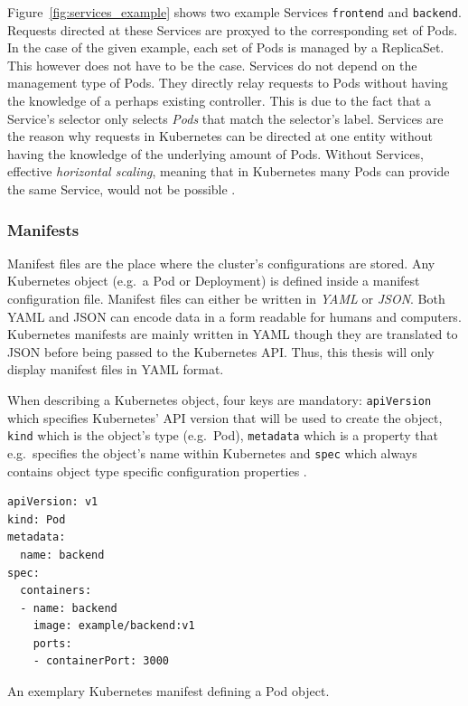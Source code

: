 Figure~\ref{fig:services_example} shows two example Services \texttt{frontend}
and \texttt{backend}. Requests directed at these Services are proxyed to the
corresponding set of Pods. In the case of the given example, each set of Pods
is managed by a ReplicaSet. This however does not have to be the case. Services
do not depend on the management type of Pods. They directly relay requests to
Pods without having the knowledge of a perhaps existing controller. This is due
to the fact that a Service's selector only selects \textit{Pods} that match the
selector's label. Services are the reason why requests in Kubernetes can be
directed at one entity without having the knowledge of the underlying amount of
Pods. Without Services, effective \textit{horizontal scaling}, meaning that in
Kubernetes many Pods can provide the same Service, would not be possible
\autocite[Ch. 5]{LuksaKubernetesAction2017}.

\subsubsection{Manifests}%
\label{ssub:Manifests}
Manifest files are the place where the cluster's configurations are stored. Any
Kubernetes object (e.g.\ a Pod or Deployment) is defined inside a manifest
configuration file. Manifest files can either be written in \textit{YAML} or
\textit{JSON}. Both YAML and JSON can encode data in a form readable for humans
and computers. Kubernetes manifests are mainly written in YAML though they are
translated to JSON before being passed to the Kubernetes \ac{API}. Thus, this
thesis will only display manifest files in YAML format.

When describing a Kubernetes object, four keys are mandatory:
\texttt{apiVersion} which specifies Kubernetes' \ac{API} version that will be
used to create the object, \texttt{kind} which is the object's type (e.g.\
Pod), \texttt{metadata} which is a property that e.g.\ specifies the object's
name within Kubernetes and \texttt{spec} which always contains object type
specific configuration properties
\autocite{AuthorsUnderstandingKubernetesObjects2019}.

\begin{listing}[H]
  \begin{verbatim}
apiVersion: v1
kind: Pod
metadata:
  name: backend
spec:
  containers:
  - name: backend
    image: example/backend:v1
    ports:
    - containerPort: 3000
  \end{verbatim}
  \caption{An exemplary Kubernetes manifest defining a Pod object.}%
  \label{listing:manifest_example}
\end{listing}

